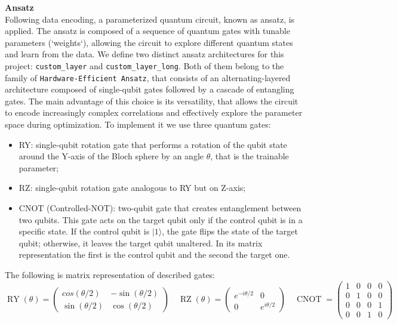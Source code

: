 \documentclass[10pt]{article}
\begin{document}
\noindent \textbf{Ansatz}\\
Following data encoding, a parameterized quantum circuit, known as ansatz, is applied. The ansatz is composed of a sequence of quantum gates with tunable parameters (`weights`), allowing the circuit to explore different quantum states and learn from the data. We define two distinct ansatz architectures for this project: \texttt{custom\_layer} and \texttt{custom\_layer\_long}. 
Both of them belong to the family of \texttt{Hardware-Efficient Ansatz}, that consists of an alternating-layered architecture composed of single-qubit gates followed by a cascade of entangling gates. The main advantage of this choice is its versatility, that allows the circuit to encode increasingly complex correlations and effectively explore the parameter space during optimization. To implement it we use three quantum gates:
\begin{itemize}
    \item RY: single-qubit rotation gate that performs a rotation of the qubit state around the Y-axis of the Bloch sphere by an angle $\theta$, that is the trainable parameter;
    \item RZ: single-qubit rotation gate analogous to RY but on Z-axis;
    \item CNOT (Controlled-NOT): two-qubit gate that creates entanglement between two qubits. This gate acts on the target qubit only if the control qubit is in a specific state. If the control qubit is $|1\rangle$, the gate flips the state of the target qubit; otherwise, it leaves the target qubit unaltered. In its matrix representation the first is the control qubit and the second the target one.
\end{itemize}
The following is matrix representation of described gates: 
\[
    \operatorname{RY}(\theta) = \begin{pmatrix} cos(\theta/2) & -\sin(\theta/2) \\ \sin(\theta/2) & \cos(\theta/2) \end{pmatrix}
    \quad
    \operatorname{RZ}(\theta) = \begin{pmatrix} e^{-i\theta/2} & 0 \\ 0 & e^{i\theta/2} \end{pmatrix}
    \quad
    \operatorname{CNOT} = \begin{pmatrix} 1 & 0 & 0 & 0 \\ 0 & 1 & 0 & 0 \\ 0 & 0 & 0 & 1 \\ 0 & 0 & 1 & 0 \end{pmatrix}
\]
\end{document}
